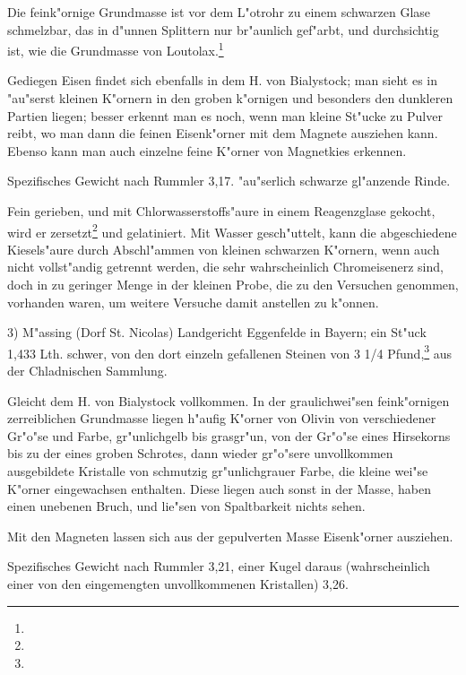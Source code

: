 \documentclass[a4paper, 11pt, oneside]{article}
\begin{document}
Die feink"ornige Grundmasse ist vor dem L"otrohr zu einem schwarzen Glase schmelzbar, das in d"unnen Splittern nur br"aunlich gef"arbt, und durchsichtig ist, wie die Grundmasse von Loutolax.\footnote{}

Gediegen Eisen findet sich ebenfalls in dem H. von Bialystock; man sieht es in "au"serst kleinen K"ornern in den groben k"ornigen und besonders den dunkleren Partien liegen; besser erkennt man es noch, wenn man kleine St"ucke zu Pulver reibt, wo man dann die feinen Eisenk"orner mit dem Magnete ausziehen kann. Ebenso kann man auch einzelne feine K"orner von Magnetkies erkennen.

Spezifisches Gewicht nach Rummler 3,17. "au"serlich schwarze gl"anzende Rinde.

Fein gerieben, und mit Chlorwasserstoffs"aure in einem Reagenzglase gekocht, wird er zersetzt\footnote{} und gelatiniert. Mit Wasser gesch"uttelt, kann die abgeschiedene Kiesels"aure durch Abschl"ammen von kleinen schwarzen K"ornern, wenn auch nicht vollst"andig getrennt werden, die sehr wahrscheinlich Chromeisenerz sind, doch in zu geringer Menge in der kleinen Probe, die zu den Versuchen genommen, vorhanden waren, um weitere Versuche damit anstellen zu k"onnen.

3) M"assing (Dorf St. Nicolas) Landgericht Eggenfelde in Bayern; ein St"uck 1,433 Lth. schwer, von den dort einzeln gefallenen Steinen von 3 1/4 Pfund,\footnote{} aus der Chladnischen Sammlung.

Gleicht dem H. von Bialystock vollkommen. In der graulichwei"sen feink"ornigen zerreiblichen Grundmasse liegen h"aufig K"orner von Olivin von verschiedener Gr"o"se und Farbe, gr"unlichgelb bis grasgr"un, von der Gr"o"se eines Hirsekorns bis zu der eines groben Schrotes, dann wieder gr"o"sere unvollkommen ausgebildete Kristalle von schmutzig gr"unlichgrauer Farbe, die kleine wei"se K"orner eingewachsen enthalten. Diese liegen auch sonst in der Masse, haben einen unebenen Bruch, und lie"sen von Spaltbarkeit nichts sehen.

Mit den Magneten lassen sich aus der gepulverten Masse Eisenk"orner ausziehen.

Spezifisches Gewicht nach Rummler 3,21, einer Kugel daraus (wahrscheinlich einer von den eingemengten unvollkommenen Kristallen) 3,26.
\end{document}
